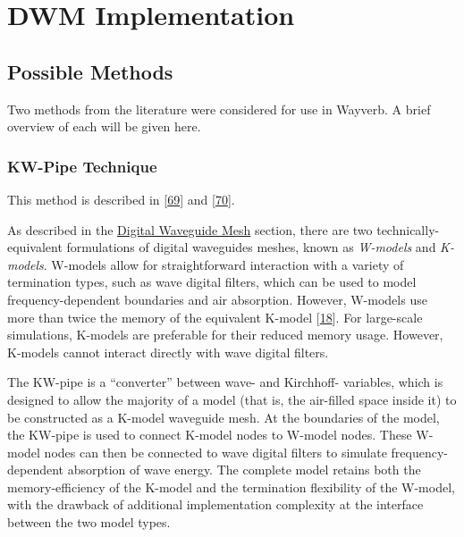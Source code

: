 \documentclass[]{scrreprt}
\begin{document}
\section{DWM Implementation}\label{dwm-implementation-1}

\subsection{Possible Methods}\label{possible-methods}

Two methods from the literature were considered for use in Wayverb. A
brief overview of each will be given here.

\subsubsection{KW-Pipe Technique}\label{kw-pipe-technique}

This method is described in
{[}\protect\hyperlink{ref-murphyux5fkw-boundaryux5f2007}{69}{]} and
{[}\protect\hyperlink{ref-kelloniemiux5ffrequency-dependentux5f2006}{70}{]}.

As described in the
\href{\%7B\%7B\%20site.baseurl\%20\%7D\%7D\%7B\%\%20link\%20waveguide.md\%20\%\%7D}{Digital
Waveguide Mesh} section, there are two technically-equivalent
formulations of digital waveguides meshes, known as \emph{W-models} and
\emph{K-models}. W-models allow for straightforward interaction with a
variety of termination types, such as wave digital filters, which can be
used to model frequency-dependent boundaries and air absorption.
However, W-models use more than twice the memory of the equivalent
K-model {[}\protect\hyperlink{ref-beesonux5froomweaver:ux5f2004}{18}{]}.
For large-scale simulations, K-models are preferable for their reduced
memory usage. However, K-models cannot interact directly with wave
digital filters.

The KW-pipe is a ``converter'' between wave- and Kirchhoff- variables,
which is designed to allow the majority of a model (that is, the
air-filled space inside it) to be constructed as a K-model waveguide
mesh. At the boundaries of the model, the KW-pipe is used to connect
K-model nodes to W-model nodes. These W-model nodes can then be
connected to wave digital filters to simulate frequency-dependent
absorption of wave energy. The complete model retains both the
memory-efficiency of the K-model and the termination flexibility of the
W-model, with the drawback of additional implementation complexity at
the interface between the two model types.
\end{document}

